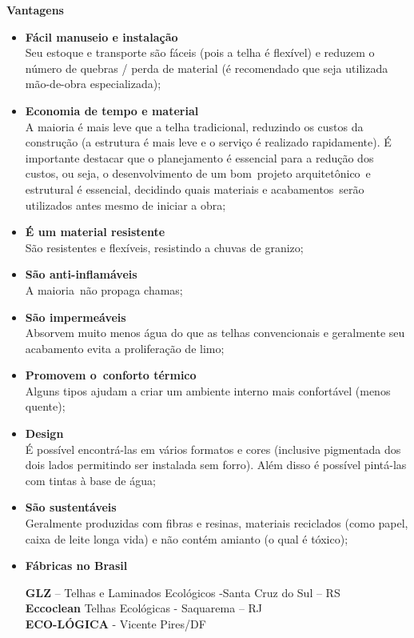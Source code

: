 \textbf{Vantagens}

\begin{itemize}
\item \textbf{Fácil manuseio e instalação}\\Seu estoque e transporte são fáceis (pois a telha é flexível) e reduzem o número de quebras / perda de material (é recomendado que seja utilizada mão-de-obra especializada);

\item \textbf{Economia de tempo e material}\\A maioria é mais leve que a telha tradicional, reduzindo os custos da construção (a estrutura é mais leve e o serviço é realizado rapidamente). É importante destacar que o planejamento é essencial para a redução dos custos, ou seja, o desenvolvimento de um bom projeto arquitetônico e estrutural é essencial, decidindo quais materiais e acabamentos serão utilizados antes mesmo de iniciar a obra;

\item \textbf{É um material resistente}\\São resistentes e flexíveis, resistindo a chuvas de granizo;

\item \textbf{São anti-inflamáveis}\\A maioria não propaga chamas;

\item \textbf{São impermeáveis}\\Absorvem muito menos água do que as telhas convencionais e geralmente seu acabamento evita a proliferação de limo;

\item \textbf{Promovem o conforto térmico}\\Alguns tipos ajudam a criar um ambiente interno mais confortável (menos quente);

\item \textbf{Design}\\É possível encontrá-las em vários formatos e cores (inclusive pigmentada dos dois lados permitindo ser instalada sem forro). Além disso é possível pintá-las com tintas à base de água;

\item \textbf{São sustentáveis}\\Geralmente produzidas com fibras e resinas, materiais reciclados (como papel, caixa de leite longa vida) e não contém amianto (o qual é tóxico);

\item \textbf{Fábricas no Brasil}

\textbf{GLZ} – Telhas e Laminados Ecológicos -Santa Cruz do Sul – RS\\
\textbf{Eccoclean} Telhas Ecológicas - Saquarema – RJ\\
\textbf{ECO-LÓGICA} - Vicente Pires/DF

\end{itemize}

